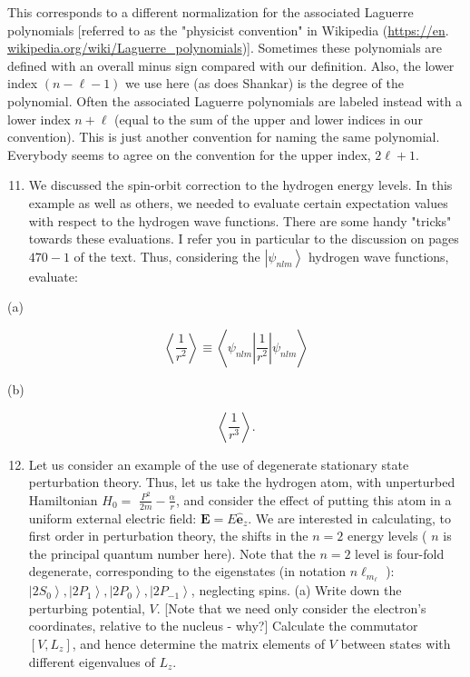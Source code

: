 \documentclass[12pt]{article}
\begin{document}
This corresponds to a different normalization for the associated Laguerre polynomials [referred to as the "physicist convention" in Wikipedia (\href{https://en}{https://en}. \href{http://wikipedia.org/wiki/Laguerre_polynomials}{wikipedia.org/wiki/Laguerre\_polynomials})]. Sometimes these polynomials are defined with an overall minus sign compared with our definition. Also, the lower index $(n-\ell-1)$ we use here (as does Shankar) is the degree of the polynomial. Often the associated Laguerre polynomials are labeled instead with a lower index $n+\ell$ (equal to the sum of the upper and lower indices in our convention). This is just another convention for naming the same polynomial. Everybody seems to agree on the convention for the upper index, $2 \ell+1$.

\begin{enumerate}
  \setcounter{enumi}{10}
  \item We discussed the spin-orbit correction to the hydrogen energy levels. In this example as well as others, we needed to evaluate certain expectation values with respect to the hydrogen wave functions. There are some handy "tricks" towards these evaluations. I refer you in particular to the discussion on pages $470-1$ of the text. Thus, considering the $\left|\psi_{n l m}\right\rangle$ hydrogen wave functions, evaluate:
\end{enumerate}

(a)

$$
\left\langle\frac{1}{r^{2}}\right\rangle \equiv\left\langle\psi_{n l m}\left|\frac{1}{r^{2}}\right| \psi_{n l m}\right\rangle
$$

(b)

$$
\left\langle\frac{1}{r^{3}}\right\rangle .
$$

\begin{enumerate}
  \setcounter{enumi}{11}
  \item Let us consider an example of the use of degenerate stationary state perturbation theory. Thus, let us take the hydrogen atom, with unperturbed Hamiltonian $H_{0}=$ $\frac{P^{2}}{2 m}-\frac{\alpha}{r}$, and consider the effect of putting this atom in a uniform external electric field: $\mathbf{E}=E \hat{\mathbf{e}}_{z}$. We are interested in calculating, to first order in perturbation theory, the shifts in the $n=2$ energy levels ( $n$ is the principal quantum number here). Note that the $n=2$ level is four-fold degenerate, corresponding to the eigenstates (in notation $n \ell_{m_{\ell}}$ ): $\left|2 S_{0}\right\rangle,\left|2 P_{1}\right\rangle,\left|2 P_{0}\right\rangle,\left|2 P_{-1}\right\rangle$, neglecting spins.
(a) Write down the perturbing potential, $V$. [Note that we need only consider the electron's coordinates, relative to the nucleus - why?] Calculate the commutator $\left[V, L_{z}\right]$, and hence determine the matrix elements of $V$ between states with different eigenvalues of $L_{z}$.
\end{enumerate}
\end{document}
